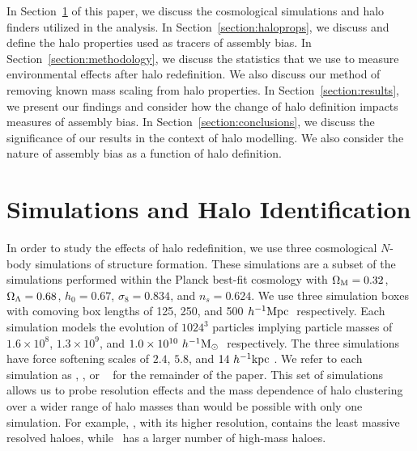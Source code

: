 \documentclass[usenatbib,fleqn]{mnras}
\begin{document}
In Section~\ref{section:data} of this paper, we discuss the cosmological simulations and halo finders utilized in the analysis. In Section~\ref{section:haloprops}, we discuss and define the halo properties used as tracers of assembly bias. In Section~\ref{section:methodology}, we discuss the statistics that we use to measure environmental effects after halo redefinition. We also discuss our method of removing known mass scaling from halo properties. In Section~\ref{section:results}, we present our findings and consider how the change of halo definition impacts measures of assembly bias. In Section~\ref{section:conclusions}, we discuss the significance of our results in the context of halo modelling. We also consider the nature of assembly bias as a function of halo definition.

\section[]{Simulations and Halo Identification}
\label{section:data}


In order to study the effects of halo redefinition, we use three cosmological $N$-body simulations of structure formation. These simulations are a subset of the  \citet{diemer_kravtsov15} simulations performed within the Planck best-fit cosmology with $\Omega_{\mathrm{M}} = 0.32$, $\Omega_{\Lambda} = 0.68$, $h_0 = 0.67$, $\sigma_8 = 0.834$, and $n_s = 0.624$. We use three simulation boxes with comoving box lengths of 125, 250, and 500$\ h^{-1}\mathrm{Mpc}~$ respectively. Each simulation models the evolution of $1024^3$ particles implying particle masses of $1.6 \times 10^8$, $1.3 \times 10^9$, and $1.0 \times 10^{10}\ h^{-1}\mathrm{M}_{\odot}~$ respectively. The three simulations have force softening scales of $2.4$, $5.8$, and $14 \ h^{-1}\mathrm{kpc}~$. We refer to each simulation as \simA, \simB, or \simC~ for the remainder of the paper. This set of simulations allows us to probe resolution effects and the mass dependence of halo clustering over a wider range of halo masses than would be possible with only one simulation. For example, \simA, with its higher resolution, contains the least massive resolved haloes, while \simC~has a larger number of high-mass haloes.
\end{document}
